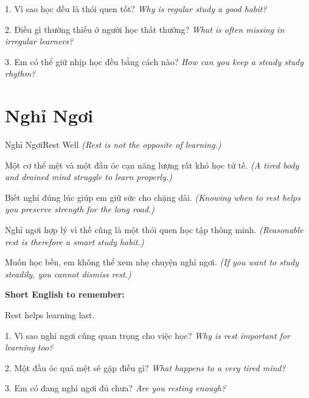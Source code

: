 \begin{tuhocnhanh}
1. Vì sao học đều là thói quen tốt? \textit{Why is regular study a good habit?}

2. Điều gì thường thiếu ở người học thất thường? \textit{What is often missing in irregular learners?}

3. Em có thể giữ nhịp học đều bằng cách nào? \textit{How can you keep a steady study rhythm?}
\end{tuhocnhanh}
\ngancach

\section{Nghỉ Ngơi}
\begin{truyen}{Nghỉ Ngơi}{Rest Well}
\textit{(Rest is not the opposite of learning.)}

Một cơ thể mệt và một đầu óc cạn năng lượng rất khó học tử tế.
\textit{(A tired body and drained mind struggle to learn properly.)}

Biết nghỉ đúng lúc giúp em giữ sức cho chặng dài.
\textit{(Knowing when to rest helps you preserve strength for the long road.)}

Nghỉ ngơi hợp lý vì thế cũng là một thói quen học tập thông minh.
\textit{(Reasonable rest is therefore a smart study habit.)}
\end{truyen}

\begin{baihoc}
Muốn học bền, em không thể xem nhẹ chuyện nghỉ ngơi.
\textit{(If you want to study steadily, you cannot dismiss rest.)}
\end{baihoc}

\begin{ghinhoanh}
\textbf{Short English to remember:}

Rest helps learning last.

\end{ghinhoanh}

\begin{tuhocnhanh}
1. Vì sao nghỉ ngơi cũng quan trọng cho việc học? \textit{Why is rest important for learning too?}

2. Một đầu óc quá mệt sẽ gặp điều gì? \textit{What happens to a very tired mind?}

3. Em có đang nghỉ ngơi đủ chưa? \textit{Are you resting enough?}
\end{tuhocnhanh}
\ngancach

